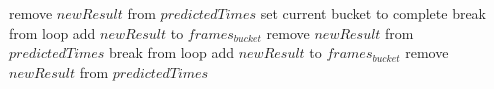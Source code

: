﻿\documentclass[a4paper]{article}
\begin{document}
\begin{algorithm}
\begin{algorithmic}[1]
                                        \State remove $newResult$ from $predictedTimes$
                                        \State set current bucket to complete
                                        \State break from loop
                                    \EndIf
                                \Else
                                    \State add $newResult$ to $frames_{bucket}$
                                    \State remove $newResult$ from $predictedTimes$
                                    \State break from loop
                                \EndIf
                            \EndFor
                        \Else
                            \State add $newResult$ to $frames_{bucket}$
                            \State remove $newResult$ from $predictedTimes$
                        \EndIf
                    \EndIf
                \EndFor
            \EndWhile
        \end{algorithmic}
    \end{algorithm}
\end{document}
